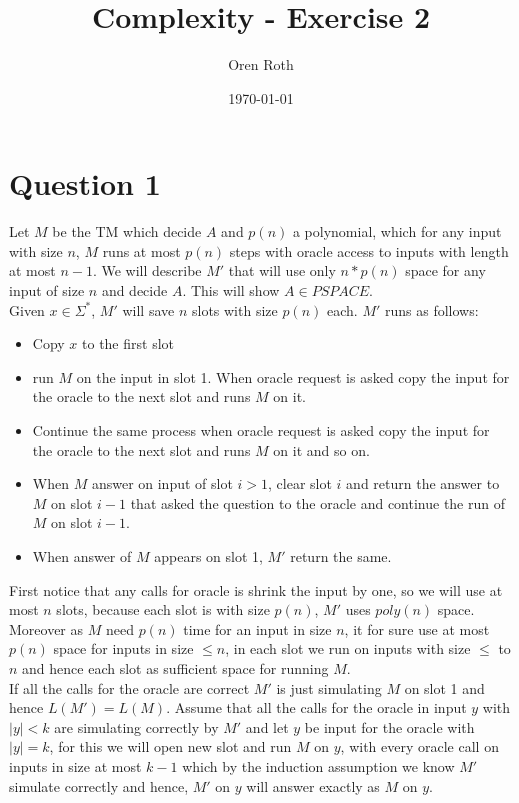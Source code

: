 \documentclass[11pt]{article}
\title{Complexity - Exercise 2}
\author{Oren Roth}
\date{\today}
\theoremstyle{plain}
\theoremstyle{nonumberplainnobrackets}
\begin{document}
\maketitle
\section*{Question 1}
 Let $M$ be the TM which decide $A$ and $p(n)$ a polynomial, which for any input with size $n$, $M$ runs at most $p(n)$ steps with oracle access to inputs with length at most $n-1$.
 We will describe $M'$ that will use only $n*p(n)$ space for any input of size $n$ and decide $A$. This will show $A\in PSPACE$.\\
Given $x\in \Sigma^*$, $M'$ will save $n$ slots with size $p(n)$ each. $M'$ runs as follows:

\begin{itemize}
	\item Copy $x$ to the first slot
	\item run $M$ on the input in slot 1. When oracle request is asked copy the input for the oracle to the next slot and runs $M$ on it. 
	\item Continue the same process when oracle request is asked copy the input for the oracle to the next slot and runs $M$ on it and so on. 
	\item When $M$ answer on input of slot $i>1$, clear slot $i$ and return the answer to $M$ on slot $i-1$ that asked the question to the oracle and continue the run of $M$ on slot $i-1$.
	\item When answer of $M$ appears on slot 1, $M'$ return the same.
\end{itemize}
First notice that any calls for oracle is shrink the input by one, so we will use at most $n$ slots, because each slot is with size $p(n)$, $M'$ uses $poly(n)$ space. Moreover as $M$ need $p(n)$ time for an input in size $n$, it for sure use at most $p(n)$ space for inputs in size $\le n$, in each slot we run on inputs with size $\le$ to $n$ and hence each slot as sufficient space for running $M$.\\  
If all the calls for the oracle are correct $M'$ is just simulating $M$ on slot 1 and hence $L(M')=L(M)$. 
Assume that all the calls for the oracle in input $y$ with $|y|<k$ are simulating correctly by $M'$ and let $y$ be input for the oracle with $|y|=k$, for this we will open new slot and run $M$ on $y$, with every oracle call on inputs in size at most $k-1$ which by the induction assumption we know $M'$ simulate correctly and hence, $M'$ on $y$ will answer exactly as $M$ on $y$.
\end{document}
